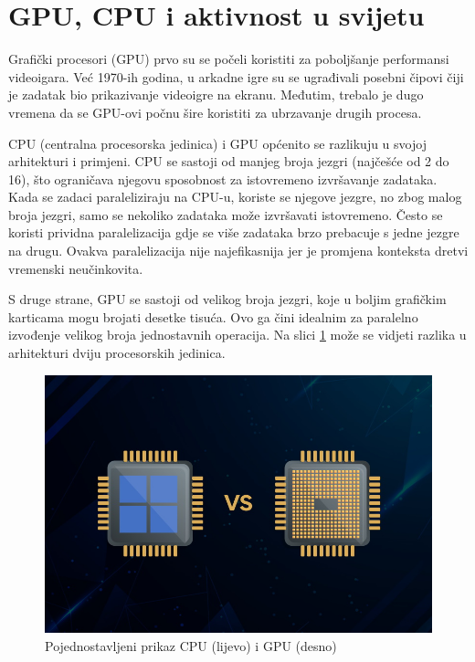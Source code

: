 \documentclass[a4paper,twocolumn]{article}
\begin{document}
	
	\section{GPU, CPU i aktivnost u svijetu}

        Grafički procesori (GPU) prvo su se počeli koristiti za poboljšanje performansi videoigara. Već 1970-ih godina, u arkadne igre su se ugrađivali posebni čipovi čiji je zadatak bio prikazivanje videoigre na ekranu. Međutim, trebalo je dugo vremena da se GPU-ovi počnu šire koristiti za ubrzavanje drugih procesa.
        
        CPU (centralna procesorska jedinica) i GPU općenito se razlikuju u svojoj arhitekturi i primjeni. CPU se sastoji od manjeg broja jezgri (najčešće od 2 do 16), što ograničava njegovu sposobnost za istovremeno izvršavanje zadataka. Kada se zadaci paraleliziraju na CPU-u, koriste se njegove jezgre, no zbog malog broja jezgri, samo se nekoliko zadataka može izvršavati istovremeno. Često se koristi prividna paralelizacija gdje se više zadataka brzo prebacuje s jedne jezgre na drugu. Ovakva paralelizacija nije najefikasnija jer je promjena konteksta dretvi vremenski neučinkovita.
        
        S druge strane, GPU se sastoji od velikog broja jezgri, koje u boljim grafičkim karticama mogu brojati desetke tisuća. Ovo ga čini idealnim za paralelno izvođenje velikog broja jednostavnih operacija. Na slici \ref{fig:cpu_vs_gpu} može se vidjeti razlika u arhitekturi dviju procesorskih jedinica.
        
        \begin{figure}[H]
        	\centering
        	\includegraphics[width=0.9\linewidth]{slike/CPU-vs-GPU.jpg}
        	\caption{Pojednostavljeni prikaz CPU (lijevo) i GPU (desno) \cite{Canny}}
        	\label{fig:cpu_vs_gpu}
        \end{figure}
        
\end{document}
